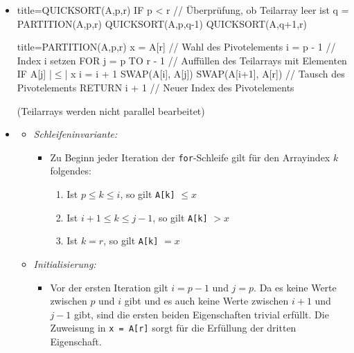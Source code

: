 \documentclass[
    12pt,
    a4paper,
    ngerman,
    color=3b,%
    marginpar=false,
    colorback=false,
    leqno,
]{tudaexercise}
\begin{document}
\begin{itemize}
    \item {}
          \begin{ccode}[autogobble,escapeinside=||]{title={QUICKSORT(A,p,r)}}
              IF p < r    // Überprüfung, ob Teilarray leer ist
                q = PARTITION(A,p,r)
                QUICKSORT(A,p,q-1)
                QUICKSORT(A,q+1,r)
          \end{ccode}
          \begin{ccode}[autogobble,escapeinside=||]{title={PARTITION(A,p,r)}}
              x = A[r]    // Wahl des Pivotelements
              i = p - 1   // Index i setzen
              FOR j = p TO r - 1 // Auffüllen des Teilarrays mit Elementen
                IF A[j] |$\leq$| x
                    i = i + 1
                    SWAP(A[i], A[j])
              SWAP(A[i+1], A[r]) // Tausch des Pivotelements
              RETURN i + 1 // Neuer Index des Pivotelements
          \end{ccode}
          (Teilarrays werden nicht parallel bearbeitet)
          \clearpage
    \item {}
          \begin{itemize}
              \item \textit{Schleifeninvariante:}
                    \begin{itemize}
                        \item[]
                              Zu Beginn jeder Iteration der \texttt{for}-Schleife gilt für den Arrayindex $k$ folgendes:
                              \begin{enumerate}
                                  \item Ist $p \leq k \leq i$, so gilt \texttt{A[k]} $\leq x$
                                  \item Ist $i+1 \leq k \leq j -1$, so gilt \texttt{A[k]} $> x$
                                  \item Ist $k = r$, so gilt \texttt{A[k]} $= x$
                              \end{enumerate}
                    \end{itemize}

              \item \textit{Initialisierung:}
                    \begin{itemize}
                        \item[]
                              Vor der ersten Iteration gilt $i = p - 1$ und $j = p$. Da es keine Werte zwischen $p$ und $i$
                              gibt und es auch keine Werte zwischen $i + 1$ und $j - 1$ gibt, sind die ersten beiden Eigenschaften
                              trivial erfüllt. Die Zuweisung in \texttt{x = A[r]} sorgt für die Erfüllung der dritten Eigenschaft.
                    \end{itemize}


\end{itemize}
\end{itemize}
\end{document}
